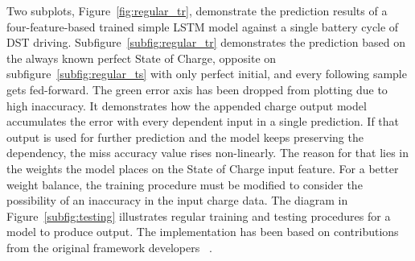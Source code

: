 %
%
Two subplots, \mbox{Figure~\ref{fig:regular_tr}}, demonstrate the prediction results of a four-feature-based trained simple LSTM model against a single battery cycle of DST driving.
\mbox{Subfigure~\ref{subfig:regular_tr}} demonstrates the prediction based on the always known perfect State of Charge, opposite on \mbox{subfigure~\ref{subfig:regular_ts}} with only perfect initial, and every following sample gets fed-forward.
The green error axis has been dropped from plotting due to high inaccuracy.
It demonstrates how the appended charge output model accumulates the error with every dependent input in a single prediction.
If that output is used for further prediction and the model keeps preserving the dependency, the miss accuracy value rises non-linearly.
The reason for that lies in the weights the model places on the State of Charge input feature.
For a better weight balance, the training procedure must be modified to consider the possibility of an inaccuracy in the input charge data.
The diagram in \mbox{Figure~\ref{subfig:testing}} illustrates regular training and testing procedures for a model to produce output.
The implementation has been based on contributions from the original framework developers ~\cite{time_2020}.
